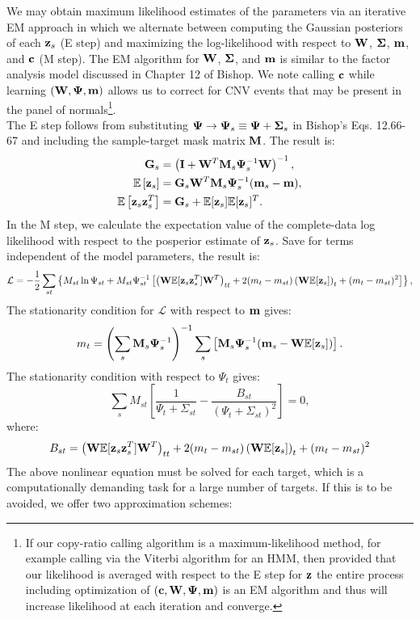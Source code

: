 \documentclass[nofootinbib,amssymb,amsmath]{revtex4}
\newcommand{\vI}{{\bf I}}
\newcommand{\vc}{{\bf c}}
\newcommand{\vz}{{\bf z}}
\newcommand{\vm}{{\bf m}}
\newcommand{\vG}{{\bf G}}
\newcommand{\vM}{{\bf M}}
\newcommand{\vW}{{\bf W}}
\newcommand{\vPsi}{{\bf \Psi}}
\newcommand{\vSigma}{{\bf \Sigma}}
\newcommand{\EE}{\mathbb{E}}
\begin{document}
We may obtain maximum likelihood estimates of the parameters via an iterative EM approach in which we alternate between computing the Gaussian posteriors of each $\vz_s$ (E step) and maximizing the log-likelihood with respect to $\vW$, $\vSigma$, $\vm$, and $\vc$ (M step). The EM algorithm for $\vW$, $\vSigma$, and $\vm$ is similar to the factor analysis model discussed in Chapter 12 of Bishop. We note calling $\vc$ while learning $(\vW, \vPsi, \vm)$ allows us to correct for CNV events that may be present in the panel of normals\footnote{If our copy-ratio calling algorithm is a maximum-likelihood method, for example calling via the Viterbi algorithm for an HMM, then provided that our likelihood is averaged with respect to the E step for $\vz$ the entire process including optimization of $(\vc, \vW, \vPsi, \vm)$ is an EM algorithm and thus will increase likelihood at each iteration and converge.}.\\

The E step follows from substituting $\vPsi \rightarrow \vPsi_s \equiv  \vPsi + \vSigma_s$ in Bishop's Eqs. 12.66-67 and including the sample-target mask matrix $\vM$. The result is:
\begin{align}
\vG_s &= \left( \vI + \vW^T \vM_s \vPsi_s^{-1} \vW \right)^{-1}, \nonumber\\
\EE \left[ \vz_s \right] &= \vG_s \vW^T \vM_s \vPsi_s^{-1} (\vm_s - \vm), \nonumber\\
\EE \left[ \vz_s \vz_s^T \right] &= \vG_s + \EE[\vz_s] \EE[\vz_s]^T.
\end{align}
%
In the M step, we calculate the expectation value of the complete-data log likelihood with respect to the posperior estimate of $\vz_s$. Save for terms independent of the model parameters, the result is:
%
\begin{equation}
\mathcal{L} = -\frac{1}{2} \sum_{st} \left\{ M_{st} \ln \Psi_{st} + M_{st} \Psi_{st}^{-1} \left[  \left( \vW \EE[\vz_s \vz_s^T] \vW^T \right)_{tt} +2 (m_t - m_{st}) \left( \vW \EE[\vz_s] \right)_t + (m_t - m_{st})^2 \right] \right\},
\end{equation}
%
The stationarity condition for $\mathcal{L}$ with respect to $\vm$ gives:
\begin{align}
m_t = \left(\sum_s \vM_s \vPsi_{s}^{-1} \right)^{-1} \sum_s \left[ \vM_s \vPsi_{s}^{-1}  (\vm_{s}  - \vW  \EE[\vz_{s}] ) \right].
\end{align}
The stationarity condition with respect to $\Psi_t$ gives:
\begin{equation}\label{eq:psi_stationarity}
\sum_s M_{st}\left[\frac{1}{\Psi_t + \Sigma_{st}} - \frac{B_{st}}{(\Psi_t + \Sigma_{st})^2} \right] = 0,
\end{equation}
where:
\begin{equation}
B_{st} = \left( \vW \EE[\vz_s \vz_s^T] \vW^T \right)_{tt} +2 (m_t - m_{st}) \left( \vW \EE[\vz_s] \right)_t + (m_t - m_{st})^2
\end{equation}
The above nonlinear equation must be solved for each target, which is a computationally demanding task for a large number of targets. If this is to be avoided, we offer two approximation schemes:\\
\end{document}
